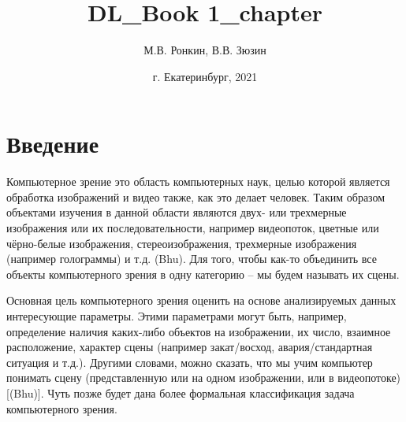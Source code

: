 \documentclass[12pt]{article}
\title{DL_Book 1_chapter}
\author{М.В. Ронкин, В.В. Зюзин }
\date{г. Екатеринбург, 2021}
\begin{document}
\begin{sloppypar}






\newpage  
\section{Введение}
Компьютерное зрение это область компьютерных наук, целью которой является обработка изображений и видео также, как это делает человек. Таким образом объектами изучения в данной области являются двух- или трехмерные изображения или их последовательности, например видеопоток, цветные или чёрно-белые изображения, стереоизображения, трехмерные изображения (например голограммы) и т.д. (Bhu). Для того, чтобы как-то объединить все объекты компьютерного зрения в одну категорию – мы будем называть их сцены.

Основная цель компьютерного зрения оценить на основе анализируемых данных интересующие параметры. Этими параметрами могут быть, например, определение наличия каких-либо объектов на изображении, их число, взаимное расположение, характер сцены (например закат/восход, авария/стандартная ситуация и т.д.). Другими словами, можно сказать, что мы учим компьютер понимать сцену (представленную или на одном изображении, или в видеопотоке) [(Bhu)]. Чуть позже будет дана более формальная классификация задача компьютерного зрения. 


\end{sloppypar}
\end{document}
